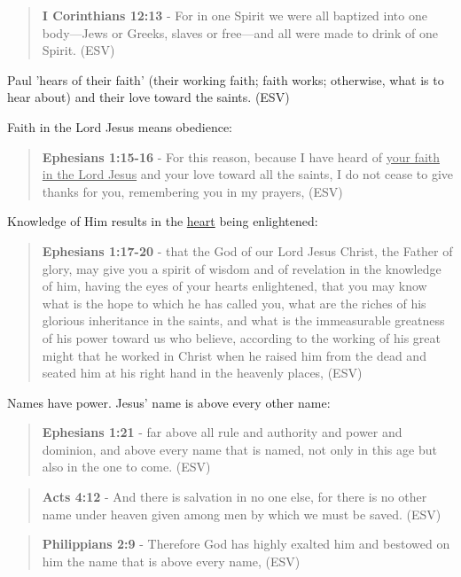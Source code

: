 \documentclass[11pt]{article}
\begin{document}
\begin{quote}
\textbf{I Corinthians 12:13} - For in one Spirit we were all baptized into one body—Jews or Greeks, slaves or free—and all were made to drink of one Spirit. (ESV)
\end{quote}

Paul 'hears of their faith' (their working faith; faith works; otherwise, what is to hear about) and their love toward the saints. (ESV)

Faith in the Lord Jesus means obedience:

\begin{quote}
\textbf{Ephesians 1:15-16} - For this reason, because I have heard of \uline{your faith in the Lord Jesus} and your love toward all the saints, I do not cease to give thanks for you, remembering you in my prayers, (ESV)
\end{quote}

Knowledge of Him results in the \uline{heart} being enlightened:

\begin{quote}
\textbf{Ephesians 1:17-20} - that the God of our Lord Jesus Christ, the Father of glory, may give you a spirit of wisdom and of revelation in the knowledge of him, having the eyes of your hearts enlightened, that you may know what is the hope to which he has called you, what are the riches of his glorious inheritance in the saints, and what is the immeasurable greatness of his power toward us who believe, according to the working of his great might that he worked in Christ when he raised him from the dead and seated him at his right hand in the heavenly places, (ESV)
\end{quote}

Names have power. Jesus' name is above every other name:

\begin{quote}
\textbf{Ephesians 1:21} - far above all rule and authority and power and dominion, and above every name that is named, not only in this age but also in the one to come. (ESV)
\end{quote}

\begin{quote}
\textbf{Acts 4:12} - And there is salvation in no one else, for there is no other name under heaven given among men by which we must be saved. (ESV)
\end{quote}

\begin{quote}
\textbf{Philippians 2:9} - Therefore God has highly exalted him and bestowed on him the name that is above every name, (ESV)
\end{quote}
\end{document}
